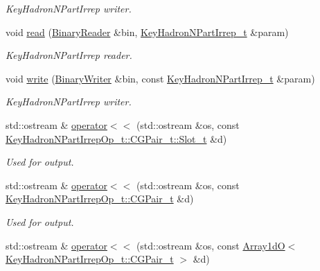 \begin{DoxyCompactItemize}
\begin{DoxyCompactList}\small\item\em Key\+Hadron\+N\+Part\+Irrep writer. \end{DoxyCompactList}\item 
void \mbox{\hyperlink{namespaceHadron_a39c4036ab90e294b04374fa9d1879ec4}{read}} (\mbox{\hyperlink{classADATIO_1_1BinaryReader}{Binary\+Reader}} \&bin, \mbox{\hyperlink{structHadron_1_1KeyHadronNPartIrrep__t}{Key\+Hadron\+N\+Part\+Irrep\+\_\+t}} \&param)
\begin{DoxyCompactList}\small\item\em Key\+Hadron\+N\+Part\+Irrep reader. \end{DoxyCompactList}\item 
void \mbox{\hyperlink{namespaceHadron_a38af8457b328042ae00ad011656edc71}{write}} (\mbox{\hyperlink{classADATIO_1_1BinaryWriter}{Binary\+Writer}} \&bin, const \mbox{\hyperlink{structHadron_1_1KeyHadronNPartIrrep__t}{Key\+Hadron\+N\+Part\+Irrep\+\_\+t}} \&param)
\begin{DoxyCompactList}\small\item\em Key\+Hadron\+N\+Part\+Irrep writer. \end{DoxyCompactList}\item 
std\+::ostream \& \mbox{\hyperlink{namespaceHadron_aa256e22743f6ceb24e2b83988cb4d7bd}{operator$<$$<$}} (std\+::ostream \&os, const \mbox{\hyperlink{structHadron_1_1KeyHadronNPartIrrepOp__t_1_1CGPair__t_1_1Slot__t}{Key\+Hadron\+N\+Part\+Irrep\+Op\+\_\+t\+::\+C\+G\+Pair\+\_\+t\+::\+Slot\+\_\+t}} \&d)
\begin{DoxyCompactList}\small\item\em Used for output. \end{DoxyCompactList}\item 
std\+::ostream \& \mbox{\hyperlink{namespaceHadron_a72505ccb2507699c4fc69053f96fe6d4}{operator$<$$<$}} (std\+::ostream \&os, const \mbox{\hyperlink{structHadron_1_1KeyHadronNPartIrrepOp__t_1_1CGPair__t}{Key\+Hadron\+N\+Part\+Irrep\+Op\+\_\+t\+::\+C\+G\+Pair\+\_\+t}} \&d)
\begin{DoxyCompactList}\small\item\em Used for output. \end{DoxyCompactList}\item 
std\+::ostream \& \mbox{\hyperlink{namespaceHadron_a3dd51258353773598e3f2a8a3252816f}{operator$<$$<$}} (std\+::ostream \&os, const \mbox{\hyperlink{classADAT_1_1Array1dO}{Array1dO}}$<$ \mbox{\hyperlink{structHadron_1_1KeyHadronNPartIrrepOp__t_1_1CGPair__t}{Key\+Hadron\+N\+Part\+Irrep\+Op\+\_\+t\+::\+C\+G\+Pair\+\_\+t}} $>$ \&d)

\end{DoxyCompactItemize}
